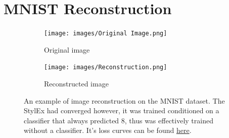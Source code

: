 \section{MNIST Reconstruction}
\label{app:MNIST_Reconstruct}
\begin{figure}[H]
    \centering
    \begin{subfigure}[]{0.3\textwidth}
         \centering
         \texttt{[image: images/Original Image.png]}
         \caption{Original image}
         \label{fig:y equals x}
     \end{subfigure}
     \hspace{10pt}
     \begin{subfigure}[]{0.3\textwidth}
         \centering
         \texttt{[image: images/Reconstruction.png]}
         \caption{Reconstructed image}
     \end{subfigure}
    \caption{An example of image reconstruction on the MNIST dataset. The StylEx had converged however, it was trained conditioned on a classifier that always predicted 8, thus was effectively trained without a classifier. It's loss curves can be found { \href{https://app.labml.ai/run/841a8fde81b511eca9da0242ac1c0002}{here}}.}
    \label{fig:MNIST_Reconstruct}
\end{figure}

